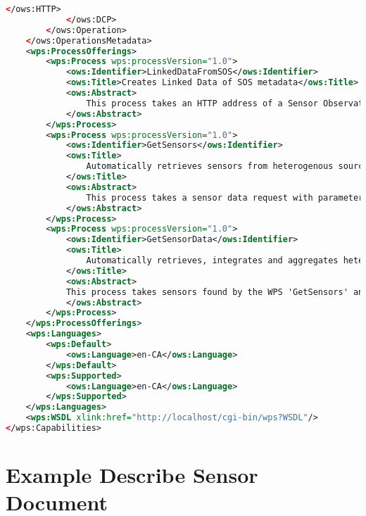 \begin{lstlisting}[language=xml]
				</ows:HTTP>
			</ows:DCP>
		</ows:Operation>
	</ows:OperationsMetadata>
	<wps:ProcessOfferings>
		<wps:Process wps:processVersion="1.0">
			<ows:Identifier>LinkedDataFromSOS</ows:Identifier>
			<ows:Title>Creates Linked Data of SOS metadata</ows:Title>
			<ows:Abstract>
				This process takes an HTTP address of a Sensor Observation Service (SOS) as input and converts the metadata to linked data.
			</ows:Abstract>
		</wps:Process>
		<wps:Process wps:processVersion="1.0">
			<ows:Identifier>GetSensors</ows:Identifier>
			<ows:Title>
				Automatically retrieves sensors from heterogenous sources using the semantic web
			</ows:Title>
			<ows:Abstract>
				This process takes a sensor data request with parameters for spatial features of interest, observed property, temporal range and granularity, and finds all relevant sensor data sources on the semantic web.
			</ows:Abstract>
		</wps:Process>
		<wps:Process wps:processVersion="1.0">
			<ows:Identifier>GetSensorData</ows:Identifier>
			<ows:Title>
				Automatically retrieves, integrates and aggregates heterogenous sensor data using the semantic web
			</ows:Title>
			<ows:Abstract>
			This process takes sensors found by the WPS 'GetSensors' and automatically integrates and aggregates the data from different sources on the web.
			</ows:Abstract>
		</wps:Process>
	</wps:ProcessOfferings>
	<wps:Languages>
		<wps:Default>
			<ows:Language>en-CA</ows:Language>
		</wps:Default>
		<wps:Supported>
			<ows:Language>en-CA</ows:Language>
		</wps:Supported>
	</wps:Languages>
	<wps:WSDL xlink:href="http://localhost/cgi-bin/wps?WSDL"/>
</wps:Capabilities>
\end{lstlisting}

\clearpage

\section{Example Describe Sensor Document}

